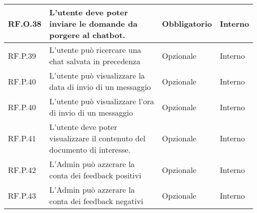 \begin{longtable}{|C{2.7cm}|L{7.2cm}|C{2.7cm}|C{2cm}|}
        \hline
        RF.O.38 & L’utente deve poter inviare le domande da porgere al chatbot.
         & Obbligatorio & Interno \\
        \hline
        RF.P.39 & L’utente può ricercare una chat salvata in precedenza
         & Opzionale & Interno \\
        \hline
        RF.P.40 & L’utente può visualizzare la data di invio di un messaggio
         & Opzionale & Interno \\
        \hline
        RF.P.40 & L’utente può visualizzare l'ora di invio di un messaggio
         & Opzionale & Interno \\
        \hline
        RF.P.41 & L’utente deve poter visualizzare il contenuto del documento di interesse.
         & Opzionale & Interno \\
        \hline
        RF.P.42 & L'Admin può azzerare la conta dei feedback positivi
         & Opzionale & Interno \\
        \hline
        RF.P.43 & L'Admin può azzerare la conta dei feedback negativi
         & Opzionale & Interno \\
        \hline
        
        


\end{longtable}